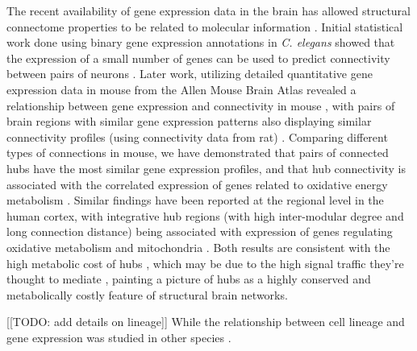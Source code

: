 \documentclass[10pt,letterpaper]{article}
\begin{document}
The recent availability of gene expression data in the brain has allowed structural connectome properties to be related to molecular information \cite{vandenHeuvel:2017ex}.
Initial statistical work done using binary gene expression annotations in \emph{C. elegans} showed that the expression of a small number of genes can be used to predict connectivity between pairs of neurons \cite{Varadan:2006ek, Kaufman2006, Baruch2008b}.
Later work, utilizing detailed quantitative gene expression data in mouse from the Allen Mouse Brain Atlas \cite{Lein:2007jn} revealed a relationship between gene expression and connectivity in mouse \cite{Ji:2014jw, Fakhry:2015kl}, with pairs of brain regions with similar gene expression patterns also displaying similar connectivity profiles (using connectivity data from rat) \cite{French2011}.
Comparing different types of connections in mouse, we have demonstrated that pairs of connected hubs have the most similar gene expression profiles, and that hub connectivity is associated with the correlated expression of genes related to oxidative energy metabolism \cite{Fulcher:2016ck}.
Similar findings have been reported at the regional level in the human cortex, with integrative hub regions (with high inter-modular degree and long connection distance) being associated with expression of genes regulating oxidative metabolism and mitochondria \cite{Vertes2016a}.
Both results are consistent with the high metabolic cost of hubs \cite{Collin:2014kq, Tomasi:2013kl}, which may be due to the high signal traffic they're thought to mediate \cite{vandenHeuvel:2012kh, Misic:2014it}, painting a picture of hubs as a highly conserved and metabolically costly feature of structural brain networks.

[[TODO: add details on lineage]] While the relationship between cell lineage and gene expression was studied in other species \cite{Cui2007, Kluger2004}.
\end{document}
